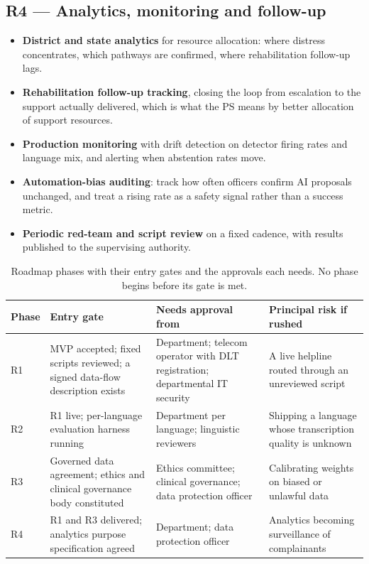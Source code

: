 \documentclass[11pt,a4paper]{article}
\begin{document}
\subsection{R4 --- Analytics, monitoring and follow-up}
\begin{itemize}
  \item \textbf{District and state analytics} for resource allocation: where distress concentrates,
        which pathways are confirmed, where rehabilitation follow-up lags.
  \item \textbf{Rehabilitation follow-up tracking}, closing the loop from escalation to the support
        actually delivered, which is what the PS means by better allocation of support resources.
  \item \textbf{Production monitoring} with drift detection on detector firing rates and language
        mix, and alerting when abstention rates move.
  \item \textbf{Automation-bias auditing}: track how often officers confirm AI proposals unchanged,
        and treat a rising rate as a safety signal rather than a success metric.
  \item \textbf{Periodic red-team and script review} on a fixed cadence, with results published to
        the supervising authority.
\end{itemize}

\begin{table}[!htbp]
\centering\footnotesize
\caption{Roadmap phases with their entry gates and the approvals each needs. No phase begins before
its gate is met.}
\label{tab:roadmapgates}
\begin{tabularx}{\linewidth}{@{}>{\raggedright\arraybackslash}p{1.2cm}>{\raggedright\arraybackslash}p{4.2cm}>{\raggedright\arraybackslash}p{4.4cm}X@{}}
\toprule
Phase & Entry gate & Needs approval from & Principal risk if rushed \\
\midrule
R1 & MVP accepted; fixed scripts reviewed; a signed data-flow description exists & Department;
telecom operator with DLT registration; departmental IT security & A live helpline routed through an
unreviewed script \\
R2 & R1 live; per-language evaluation harness running & Department per language; linguistic reviewers
& Shipping a language whose transcription quality is unknown \\
R3 & Governed data agreement; ethics and clinical governance body constituted & Ethics committee;
clinical governance; data protection officer & Calibrating weights on biased or unlawful data \\
R4 & R1 and R3 delivered; analytics purpose specification agreed & Department; data protection officer
& Analytics becoming surveillance of complainants \\
\bottomrule
\end{tabularx}
\end{table}
\end{document}
